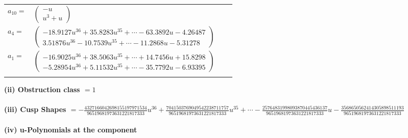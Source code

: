 \documentclass[1p]{elsarticle_modified}
\theoremstyle{definition}
\begin{document}
\begin{tabular}{m{7pt} m{180pt} m{7pt} m{180pt} }
\flushright $a_{10}=$&$\begin{pmatrix}- u\\u^3+u\end{pmatrix}$ \\
\flushright $a_{4}=$&$\begin{pmatrix}-18.9127 u^{36}+35.8283 u^{35}+\cdots-63.3892 u-4.26487\\3.51876 u^{36}-10.7539 u^{35}+\cdots-11.2868 u-5.31278\end{pmatrix}$ \\
\flushright $a_{1}=$&$\begin{pmatrix}-16.9025 u^{36}+38.5063 u^{35}+\cdots+14.7456 u+15.8298\\-5.28954 u^{36}+5.11532 u^{35}+\cdots-35.7792 u-6.93395\end{pmatrix}$\\&\end{tabular}
\flushleft \textbf{(ii) Obstruction class $= 1$}\\~\\
\flushleft \textbf{(iii) Cusp Shapes $= -\frac{4327166042698155197971534}{96519681973631221817333} u^{36}+\frac{7041503769049542238711757}{96519681973631221817333} u^{35}+\cdots-\frac{25764831998093870445436137}{96519681973631221817333} u-\frac{3568650562414305898511193}{96519681973631221817333}$}\\~\\
\newpage\renewcommand{\arraystretch}{1}
\flushleft \textbf{(iv) u-Polynomials at the component}\newline \\
\end{document}
